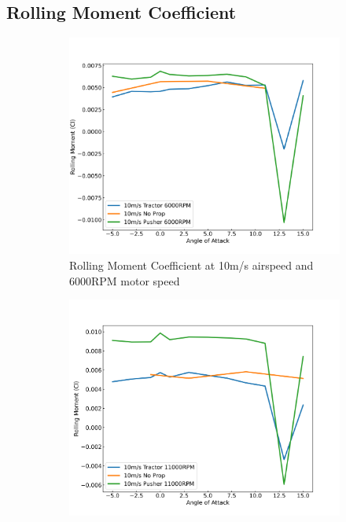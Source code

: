\subsection{Rolling Moment Coefficient}

\begin{figure}[H]
    \centering
    \begin{subfigure}[b]{0.467\textwidth}
        \centering
        \includegraphics[width=\textwidth]{05_Results/Figs/Cl_roll/10ms_6000RPM_Cl_roll.png}
        \caption{Rolling Moment Coefficient at 10m/s airspeed and 6000RPM motor speed}
        \label{fig:Cl_roll_10ms_6000}
    \end{subfigure}
    \begin{subfigure}[b]{0.467\textwidth}
        \centering
        \includegraphics[width=\textwidth]{05_Results/Figs/Cl_roll/10ms_11000RPM_Cl.png}

\end{subfigure}
\end{figure}
